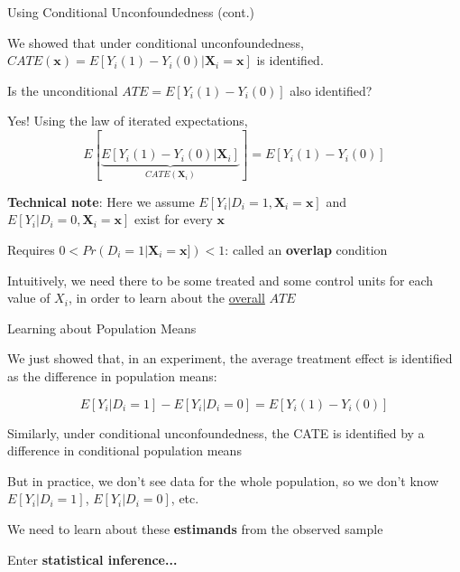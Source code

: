 \documentclass[11pt,english,handout]{beamer}
\newenvironment{wideitemize}{\itemize\addtolength{\itemsep}{10pt}}{\enditemize}
\begin{document}
\begin{frame}{Using Conditional Unconfoundedness (cont.)}
\vspace{0.2cm}
	\begin{wideitemize}
		\item 
		We showed that under conditional unconfoundedness, $CATE(\mathbf{x}) = E[Y_i(1) - Y_i(0) | \mathbf{X}_i= \mathbf{x}] $ is identified.
		
		\item 
		Is the unconditional $ATE=E[Y_i(1) - Y_i(0)]$ also identified? 
		
		\pause
		\item
		Yes! Using the law of iterated expectations,
		$$E[ \underbrace{E[Y_i(1) - Y_i(0) | \mathbf{X}_i] }_{ CATE(\mathbf{X}_i) }  ] = E[Y_i(1) - Y_i(0)]$$
		
		\pause
		
		\item
		\textbf{Technical note}: Here we assume $E[Y_i | D_i = 1, \mathbf{X}_i= \mathbf{x}]$ and $E[Y_i | D_i =0,\mathbf{X}_i= \mathbf{x}]$ exist for every $\mathbf{x}$
		
		\pause
		\item
		Requires $0< Pr(D_i = 1 |\mathbf{X}_i= \mathbf{x}]) < 1$: called an \textbf{overlap} condition
		
		\item
		Intuitively, we need there to be some treated and some control units for each value of $X_i$, in order to learn about the \uline{overall} $ATE$
	\end{wideitemize}
\end{frame}


\begin{frame}{Learning about Population Means}
	
	\begin{wideitemize}
		\item We just showed that, in an experiment, the average treatment effect is identified as the difference in population means:
		
		$$E[Y_i | D_i = 1] - E[Y_i |D_i =0] = E[Y_i(1)-Y_i(0)]$$

		\item
		Similarly, under conditional unconfoundedness, the CATE is identified by a difference in conditional population means
		
		\pause
		\item
		But in practice, we don't see data for the whole population, so we don't know $E[Y_i | D_i = 1]$, $E[Y_i | D_i = 0]$, etc. 
		
		\pause
		\item
		We need to learn about these \textbf{estimands} from the observed sample 
		
		\item
		Enter \textbf{statistical inference...}
	\end{wideitemize}
	
\end{frame}
\end{document}

